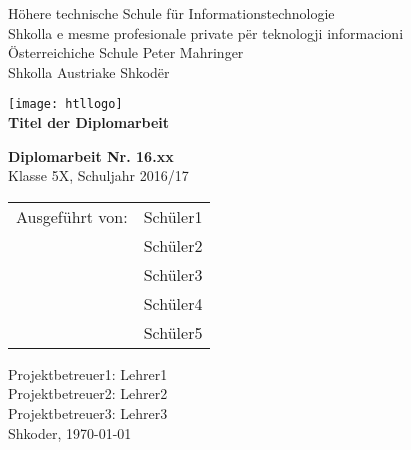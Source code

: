 
\newcommand{\trtitle}{Titel der Diplomarbeit}
\newcommand{\trort}{Shkoder}
\newcommand{\trbetreuer}{Titel Betreuer}
\newcommand{\trdate}{\today}
\newcommand{\trnumber}{16.xx}
\newcommand{\trclass}{5X}
\newcommand{\trschuelereins}{Sch\"uler1}
\newcommand{\trschuelerzwei}{Sch\"uler2}
\newcommand{\trschuelerdrei}{Sch\"uler3}
\newcommand{\trschuelervier}{Sch\"uler4}
\newcommand{\trschuelerfuenf}{Sch\"uler5}
\newcommand{\trsauftraggeber}{Herr Max Mustermann oder Firma}
\newcommand{\trbetreuereins}{Lehrer1}
\newcommand{\trbetreuerzwei}{Lehrer2}
\newcommand{\trbetreuerdrei}{Lehrer3}

\thispagestyle{empty}

\begin{center}
  \large H\"ohere technische Schule f\"ur Informationstechnologie \\
  \large Shkolla e mesme profesionale private p\"er teknologji informacioni \\
  \Huge \"Osterreichiche Schule \glqq Peter Mahringer\grqq \\
  \Large Shkolla Austriake Shkod\"er
\end{center}

\begin{center}
  \texttt{[image: htllogo]} \\
  \textbf{\LARGE \trtitle}
\end{center}
\vspace{1cm}

\begin{flushleft}
\textbf{\LARGE Diplomarbeit Nr. \trnumber} \\
\LARGE Klasse \trclass{}, Schuljahr 2016/17

\begin{table}[htbp]
\Large
\begin{tabular}{cl}
   Ausgef\"uhrt von: & \trschuelereins \\ 
   & \trschuelerzwei \\ 
   & \trschuelerdrei \\ 
   & \trschuelervier \\ 
   & \trschuelerfuenf \\ 
 \end{tabular}
\end{table}
\end{flushleft}


\large Projektbetreuer1: \trbetreuereins \\
\large Projektbetreuer2: \trbetreuerzwei \\
\large Projektbetreuer3: \trbetreuerdrei \\
\newline
\large \trort{}, \today

\vfill